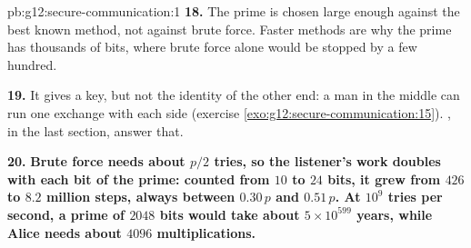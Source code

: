 \begin{solution}{pb:g12:secure-communication:1}
\textbf{18.} The prime is chosen large enough against the best known method, not against brute force. Faster methods
are why the prime has thousands of bits, where brute force alone would be stopped by a few hundred.

\textbf{19.} It gives a key, but not the identity of the other end: a man in the middle can run one exchange with
each side (exercise \ref{exo:g12:secure-communication:15}). , in the last section, answer that.

\textbf{20.} \textbf{Brute force needs about $p/2$ tries, so the listener's work doubles with each bit of the prime:
counted from $10$ to $24$ bits, it grew from $426$ to $8.2$ million steps, always between $0.30\,p$ and $0.51\,p$. At
$10^9$ tries per second, a prime of $2048$ bits would take about $5 \times 10^{599}$ years, while Alice needs about
$4096$ multiplications.}
\end{solution}
